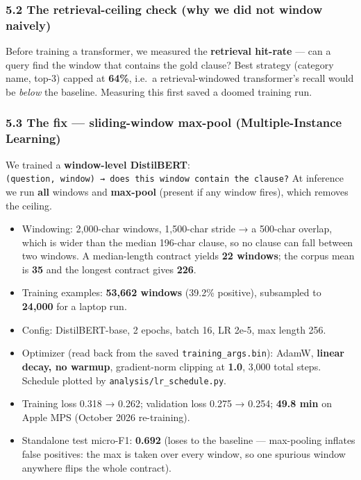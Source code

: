 \documentclass[
  10pt,
]{article}
\providecommand{\tightlist}{%
  \setlength{\itemsep}{0pt}\setlength{\parskip}{0pt}}
\begin{document}
\subsubsection{5.2 The retrieval-ceiling check (why we did not window naively)}

Before training a transformer, we measured the \textbf{retrieval hit-rate} ---
can a query find the window that contains the gold clause? Best strategy
(category name, top-3) capped at \textbf{64\%}, i.e.~a retrieval-windowed
transformer's recall would be \emph{below} the baseline. Measuring this first
saved a doomed training run.

\subsubsection{5.3 The fix --- sliding-window max-pool (Multiple-Instance
Learning)}

We trained a \textbf{window-level DistilBERT}:
\texttt{(question,\ window)\ →\ does\ this\ window\ contain\ the\ clause?} At
inference we run \textbf{all} windows and \textbf{max-pool} (present if any
window fires), which removes the ceiling.

\begin{itemize}
\tightlist
\item
  Windowing: 2,000-char windows, 1,500-char stride → a 500-char overlap, which
  is wider than the median 196-char clause, so no clause can fall between two
  windows. A median-length contract yields \textbf{22 windows}; the corpus mean
  is \textbf{35} and the longest contract gives \textbf{226}.
\item
  Training examples: \textbf{53,662 windows} (39.2\% positive), subsampled to
  \textbf{24,000} for a laptop run.
\item
  Config: DistilBERT-base, 2 epochs, batch 16, LR 2e-5, max length 256.
\item
  Optimizer (read back from the saved \texttt{training\_args.bin}): AdamW,
  \textbf{linear decay, no warmup}, gradient-norm clipping at \textbf{1.0},
  3,000 total steps. Schedule plotted by \texttt{analysis/lr\_schedule.py}.
\item
  Training loss 0.318 → 0.262; validation loss 0.275 → 0.254; \textbf{49.8 min}
  on Apple MPS (October 2026 re-training).
\item
  Standalone test micro-F1: \textbf{0.692} (loses to the baseline ---
  max-pooling inflates false positives: the max is taken over every window, so
  one spurious window anywhere flips the whole contract).
\end{itemize}
\end{document}
